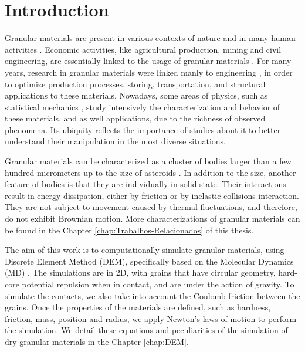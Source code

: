 
\chapter{Introduction}
\label{chap:Introducao}
    Granular materials are present in various contexts of nature and in many human activities \cite{Granular_Media_Between_Fluid_and_Solid, Sands_Powders_and_Grains, The_Physics_of_Granular_Media, Granular_Physics, Micromechanics_of_Granular_Materials}. Economic activities, like agricultural production, mining and civil engineering, are essentially linked to the usage of granular materials \cite{Sands_Powders_and_Grains}. For many years, research in granular materials were linked manly to engineering \cite{Abraao-Dissertacao, Versuche_uber_Getreidedruck_in_Silozellen, Janssen}, in order to optimize production processes, storing, transportation, and structural applications to these materials. Nowadays, some areas of physics, such as statistical mechanics \cite{Unifying_Concepts_in_Granular_Media_and_Glasses}, study intensively the characterization and behavior of these materials, and as well applications, due to the richness of observed phenomena. Its ubiquity reflects the importance of studies about it to better understand their manipulation in the most diverse situations.

    Granular materials can be characterized as a cluster of bodies larger than a few hundred micrometers up to the size of asteroids \cite{Sands_Powders_and_Grains, The_Physics_of_Granular_Media}. In addition to the size, another feature of bodies is that they are individually in solid state. Their interactions result in energy dissipation, either by friction or by inelastic collisions interaction. They are not subject to movement caused by thermal fluctuations, and therefore, do not exhibit Brownian motion. More characterizations of granular materials can be found in the Chapter \ref{chap:Trabalhos-Relacionados} of this thesis.

    The aim of this work is to computationally simulate granular materials, using Discrete Element Method (DEM), specifically based on the Molecular Dynamics (MD) \cite{Computer_Simulation_of_Liquids}. The simulations are in 2D, with grains that have circular geometry, hard-core potential repulsion when in contact, and are under the action of gravity. To simulate the contacts, we also take into account the Coulomb friction between the grains. Once the properties of the materials are defined, such as hardness, friction, mass, position and radius, we apply Newton's laws of motion to perform the simulation. We detail these equations and peculiarities of the simulation of dry granular materials in the Chapter \ref{chap:DEM}.

